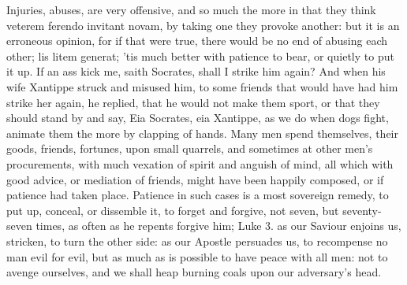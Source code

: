 {Injuries, abuses, are very offensive, and so much the more in that they
think veterem ferendo invitant novam, by taking one they provoke
another: but it is an erroneous opinion, for if that were true, there
would be no end of abusing each other; lis litem generat; 'tis much
better with patience to bear, or quietly to put it up. If an ass kick
me, saith Socrates, shall I strike him again? And when his wife
Xantippe struck and misused him, to some friends that would have had
him strike her again, he replied, that he would not make them sport, or
that they should stand by and say, Eia Socrates, eia Xantippe, as we do
when dogs fight, animate them the more by clapping of hands. Many men
spend themselves, their goods, friends, fortunes, upon small quarrels,
and sometimes at other men's procurements, with much vexation of spirit
and anguish of mind, all which with good advice, or mediation of
friends, might have been happily composed, or if patience had taken
place. Patience in such cases is a most sovereign remedy, to put up,
conceal, or dissemble it, to forget and forgive, not seven,
but seventy-seven times, as often as he repents forgive him; Luke 
3. as our Saviour enjoins us, stricken, to turn the other side: as our
Apostle persuades us, to recompense no man evil for evil, but as
much as is possible to have peace with all men: not to avenge
ourselves, and we shall heap burning coals upon our adversary's head.

}
